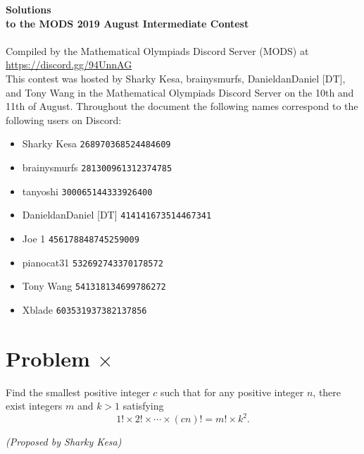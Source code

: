 \documentclass[10pt]{article}
\begin{document}
		\setcounter{section}{0}
		\noindent \huge\textbf{Solutions}\vspace{2pt}\\
		\noindent \large\textbf{to the MODS 2019 August Intermediate Contest} \vspace{3pt}\\
		\noindent \makebox[\linewidth]{\rule{\textwidth}{0.4pt}}\\
	
		\noindent \normalsize Compiled by the Mathematical Olympiads Discord Server (MODS) at \url{https://discord.gg/94UnnAG}\\
		
		\noindent This contest was hosted by Sharky Kesa, brainysmurfs, DanieldanDaniel [DT], and Tony Wang in the Mathematical Olympiads Discord Server on the 10th and 11th of August. Throughout the document the following names correspond to the following users on Discord:
		\begin{itemize}[noitemsep]
		\item Sharky Kesa \tabto*{100pt}\texttt{268970368524484609}
		\item brainysmurfs \tabto*{100pt}\texttt{281300961312374785}
		\item tanyoshi \tabto*{100pt}\texttt{300065144333926400}
		\item DanieldanDaniel [DT] \tabto*{100pt}\texttt{414141673514467341}
		\item Joe 1 \tabto*{100pt}\texttt{456178848745259009}
		\item pianocat31 \tabto*{100pt}\texttt{532692743370178572}
		\item Tony Wang \tabto*{100pt}\texttt{541318134699786272}
		\item Xblade \tabto*{100pt}\texttt{603531937382137856}
		\end{itemize}
		
		
	\newpage		
			
	\section*{Problem \Large \(\times\)}
	
	Find the smallest positive integer \(c\) such that for any positive integer $n$, there exist integers \(m\) and \(k>1\) satisfying \[1! \times 2! \times \cdots \times (cn)! = m! \times k^2.\]
	\begin{flushright}
	\textit{(Proposed by Sharky Kesa)}
	\end{flushright}
	
\end{document}

